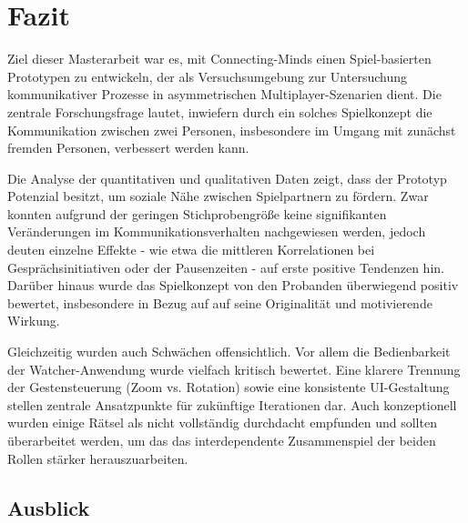 \chapter{Fazit}
Ziel dieser Masterarbeit war es, mit Connecting-Minds einen Spiel-basierten Prototypen zu entwickeln, der als Versuchsumgebung zur Untersuchung kommunikativer Prozesse in asymmetrischen Multiplayer-Szenarien dient. Die zentrale Forschungsfrage lautet, inwiefern durch ein solches Spielkonzept die Kommunikation zwischen zwei Personen, insbesondere im Umgang mit zunächst fremden Personen, verbessert werden kann.

Die Analyse der quantitativen und qualitativen Daten zeigt, dass der Prototyp Potenzial besitzt, um soziale Nähe zwischen Spielpartnern zu fördern. Zwar konnten aufgrund der geringen Stichprobengröße keine signifikanten Veränderungen im Kommunikationsverhalten nachgewiesen werden, jedoch deuten einzelne Effekte - wie etwa die mittleren Korrelationen bei Gesprächsinitiativen oder der Pausenzeiten - auf erste positive Tendenzen hin. Darüber hinaus wurde das Spielkonzept von den Probanden überwiegend positiv bewertet, insbesondere in Bezug auf auf seine Originalität und motivierende Wirkung.

Gleichzeitig wurden auch Schwächen offensichtlich. Vor allem die Bedienbarkeit der Watcher-Anwendung wurde vielfach kritisch bewertet. Eine klarere Trennung der Gestensteuerung (Zoom vs. Rotation) sowie eine konsistente UI-Gestaltung stellen zentrale Ansatzpunkte für zukünftige Iterationen dar. Auch konzeptionell wurden einige Rätsel als nicht vollständig durchdacht empfunden und sollten überarbeitet werden, um das das interdependente Zusammenspiel der beiden Rollen stärker herauszuarbeiten.

\section{Ausblick}\label{sec:prospect}

